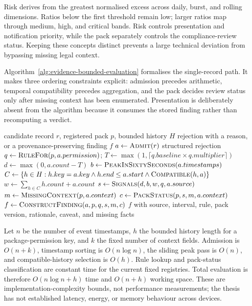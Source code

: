 Risk derives from the greatest normalised excess across daily, burst, and rolling dimensions. Ratios below the first threshold remain low; larger ratios map through medium, high, and critical bands. Risk controls presentation and notification priority, while the pack separately controls the compliance-review status. Keeping these concepts distinct prevents a large technical deviation from bypassing missing legal context.

Algorithm~\ref{alg:evidence-bounded-evaluation} formalises the single-record path. It makes three ordering constraints explicit: admission precedes arithmetic, temporal compatibility precedes aggregation, and the pack decides review status only after missing context has been enumerated. Presentation is deliberately absent from the algorithm because it consumes the stored finding rather than recomputing a verdict.

\begin{algorithm}[H]
\caption{Evidence-bounded evaluation of one candidate record}
\label{alg:evidence-bounded-evaluation}
\begin{algorithmic}[1]
\Require candidate record $r$, registered pack $p$, bounded history $H$
\Ensure rejection with a reason, or a provenance-preserving finding $f$
\State $a \gets \Call{Admit}{r}$ 
 \State \Return structured rejection \EndIf
\State $q \gets \Call{RuleFor}{p,a.permission}$; $T \gets \max(1,\lceil q.baseline\times q.multiplier\rceil)$
\State $d \gets \max(0,a.count-T)$
\State $b \gets \Call{PeakInSixtySeconds}{a.timestamps}$
\State $C \gets \{h\in H: h.key=a.key \land h.end\leq a.start \land \Call{Compatible}{h,a}\}$
\State $w \gets \sum_{h\in C}h.count+a.count$
\State $s \gets \Call{Signals}{d,b,w,q,a.source}$
\State $m \gets \Call{MissingContext}{p,a.context}$
\State $c \gets \Call{PackStatus}{p,s,m,a.context}$
\State $f \gets \Call{ConstructFinding}{a,p,q,s,m,c}$
\State \Return $f$ with source, interval, rule, pack version, rationale, caveat, and missing facts
\end{algorithmic}
\end{algorithm}

Let $n$ be the number of event timestamps, $h$ the bounded history length for a package-permission key, and $k$ the fixed number of context fields. Admission is $O(n+k)$, timestamp sorting is $O(n\log n)$, the sliding peak pass is $O(n)$, and compatible-history selection is $O(h)$. Rule lookup and pack-status classification are constant time for the current fixed registries. Total evaluation is therefore $O(n\log n+h)$ time and $O(n+h)$ working space. These are implementation-complexity bounds, not performance measurements; the thesis has not established latency, energy, or memory behaviour across devices.

